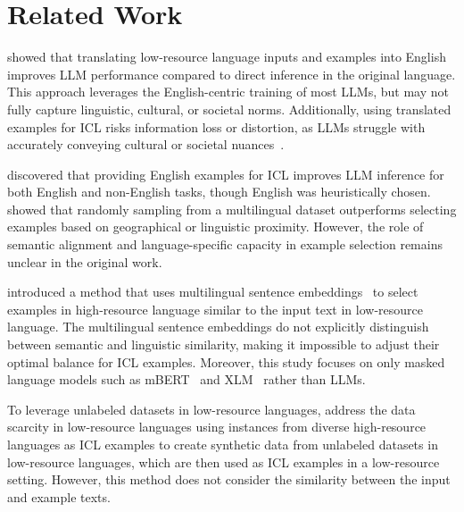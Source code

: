 \section{Related Work}
\label{sec:rel}


\citet{etxaniz-etal-2024-multilingual} showed that translating low-resource language inputs and examples into English improves LLM performance compared to direct inference in the original language. This approach leverages the English-centric training of most LLMs, but may not fully capture linguistic, cultural, or societal norms. Additionally, using translated examples for ICL risks information loss or distortion, as LLMs struggle with accurately conveying cultural or societal nuances~\cite{yao2023benchmarking,tenzer2024ai,intrator-etal-2024-breaking}.



\citet{winata-etal-2021-language} discovered that providing English examples for ICL improves LLM inference for both English and non-English tasks, though English was heuristically chosen. \citet{winata-etal-2022-cross} showed that randomly sampling from a multilingual dataset outperforms selecting examples based on geographical or linguistic proximity. However, the role of semantic alignment and language-specific capacity in example selection remains unclear in the original work.


\citet{nie-etal-2023-cross} introduced a method that uses multilingual sentence embeddings~\cite{conneau-etal-2020-unsupervised} to select examples in high-resource language similar to the input text in low-resource language.
The multilingual sentence embeddings do not explicitly distinguish between semantic and linguistic similarity, making it impossible to adjust their optimal balance for ICL examples.
Moreover, this study focuses on only masked language models such as mBERT~\cite{devlin-etal-2019-bert} and XLM~\cite{conneau-etal-2020-unsupervised} rather than LLMs.





To leverage unlabeled datasets in low-resource languages, \citet{nguyen-etal-2024-democratizing} address the data scarcity in low-resource languages  using instances from diverse high-resource languages as ICL examples to create synthetic data from unlabeled datasets in low-resource languages, which are then used as ICL examples in a low-resource setting.
However, this method does not consider the similarity between the input and example texts.


